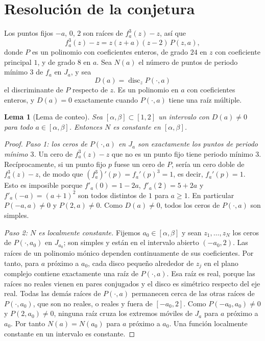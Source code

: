 \documentclass[12pt,a4paper]{report}
\newtheorem{lema}{Lema}[section]
\theoremstyle{definition}
\begin{document}
\section{Resolución de la conjetura}

Los puntos fijos $-a$, $0$, $2$ son raíces de $f_a^3(z) - z$, así que
\[
f_a^3(z) - z = z(z+a)(z-2)\,P(z,a),
\]
donde $P$ es un polinomio con coeficientes enteros, de grado $24$ en $z$ con coeficiente principal $1$, y de grado $8$ en $a$. Sea $N(a)$ el número de puntos de periodo mínimo $3$ de $f_a$ en $J_a$, y sea
\[
D(a) = \operatorname{disc}_z P(\cdot,a)
\]
el discriminante de $P$ respecto de $z$. Es un polinomio en $a$ con coeficientes enteros, y $D(a)=0$ exactamente cuando $P(\cdot,a)$ tiene una raíz múltiple.

\begin{lema}[Lema de conteo]\label{lem:count}
Sea $[\alpha,\beta]\subset[1,2]$ un intervalo con $D(a)\ne0$ para todo $a\in[\alpha,\beta]$. Entonces $N$ es constante en $[\alpha,\beta]$.
\end{lema}

\begin{proof}
\emph{Paso 1: los ceros de $P(\cdot, a)$ en $J_a$ son exactamente los puntos de periodo mínimo $3$.} Un cero de $f_a^3(z) - z$ que no es un punto fijo tiene periodo mínimo $3$. Recíprocamente, si un punto fijo $p$ fuese un cero de $P$, sería un cero doble de $f^3_a(z)-z$, de modo que $(f_a^3)'(p) = f_a'(p)^3 = 1$, es decir, $f_a'(p) = 1$. Esto es imposible porque $f'_a(0) = 1-2a$, $f'_a(2) = 5+2a$ y $f'_a(-a) = (a+1)^2$ son todos distintos de $1$ para $a\ge1$. En particular $P(-a,a)\ne0$ y $P(2,a)\ne0$. Como $D(a)\neq 0$, todos los ceros de $P(\cdot,a)$ son simples.

\emph{Paso 2: $N$ es localmente constante.} Fijemos $a_0\in[\alpha,\beta]$ y sean $z_1,\dots,z_N$ los ceros de $P(\cdot,a_0)$ en $J_{a_0}$; son simples y están en el intervalo abierto $(-a_0,2)$. Las raíces de un polinomio mónico dependen continuamente de sus coeficientes. Por tanto, para $a$ próximo a $a_0$, cada disco pequeño alrededor de $z_j$ en el plano complejo contiene exactamente una raíz de $P(\cdot,a)$. Esa raíz es real, porque las raíces no reales vienen en pares conjugados y el disco es simétrico respecto del eje real. Todas las demás raíces de $P(\cdot,a)$ permanecen cerca de las otras raíces de $P(\cdot,a_0)$, que son no reales, o reales y fuera de $[-a_0,2]$. Como $P(-a_0,a_0)\neq 0$ y $P(2,a_0)\ne 0$, ninguna raíz cruza los extremos móviles de $J_a$ para $a$ próximo a $a_0$. Por tanto $N(a) = N(a_0)$ para $a$ próximo a $a_0$. Una función localmente constante en un intervalo es constante.
\end{proof}
\end{document}
